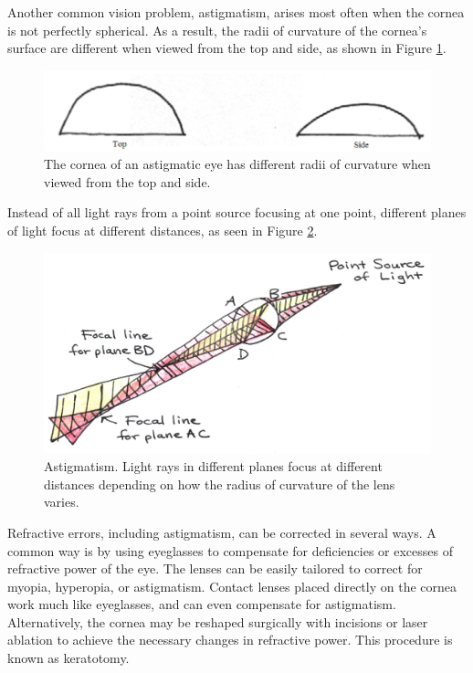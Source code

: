 Another common vision problem, astigmatism, arises most often when the cornea is not perfectly spherical.  As a result, the radii of curvature of the cornea’s surface are different when viewed from the top and side, as shown in Figure \ref{Fig5-18}.
\begin{figure}[h]
	\centering
	\includegraphics[width=\textwidth]{./figures/Topic5/Fig5-18.png}
	\caption{The cornea of an astigmatic eye has different radii of curvature when viewed from the top and side.}
	\label{Fig5-18}
\end{figure} 
Instead of all light rays from a point source focusing at one point, different planes of light focus at different distances, as seen in Figure \ref{Fig5-19}.
\begin{figure}[h]
	\centering
	\includegraphics[width=\textwidth]{./figures/Topic5/Fig5-19.jpg}
	\caption{Astigmatism. Light rays in different planes focus at different distances depending on how the radius of curvature of the lens varies.}
	\label{Fig5-19}
\end{figure}
   
Refractive errors, including astigmatism, can be corrected in several ways. A common way is by using eyeglasses to compensate for deficiencies or excesses of refractive power of the eye. The lenses can be easily tailored to correct for myopia, hyperopia, or astigmatism.  Contact lenses placed directly on the cornea work much like eyeglasses, and can even compensate for astigmatism. Alternatively, the cornea may be reshaped surgically with incisions or laser ablation to achieve the necessary changes in refractive power. This procedure is known as keratotomy. 
